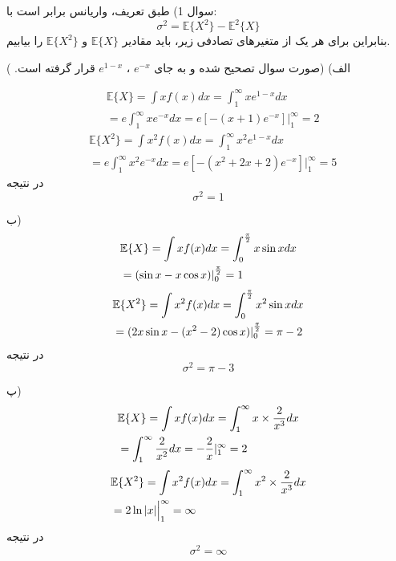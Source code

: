 \documentclass[10pt,letterpaper]{report}
\begin{document}
سوال 1) طبق تعریف، واریانس برابر است با:
$$
\sigma^2=\mathbb{E}\{X^2\}-\mathbb{E}^2\{X\}
$$
بنابراین برای هر یک از متغیرهای تصادفی زیر، باید مقادیر 
$
\mathbb{E}\{X\}
$
و
$
\mathbb{E}\{X^2\}
$
را بیابیم.

الف) 
{\color{red}
(صورت سوال تصحیح شده و به جای
 $e^{-x}$
،
$e^{1-x}$
قرار گرفته است.
)
}

\begin{equation}
\begin{split}
&
\mathbb{E}\{X\}=\int xf(x)dx=\int_1^\infty xe^{1-x}dx
\\&=
e\int_1^\infty xe^{-x}dx
=e[-(x+1)e^{-x}]|_{1}^\infty=2
\end{split}
\end{equation}
\begin{equation}
\begin{split}
&
\mathbb{E}\{X^2\}=\int x^2f(x)dx=\int_1^\infty x^2e^{1-x}dx
\\&=
e\int_1^\infty x^2e^{-x}dx
=e[-(x^2+2x+2)e^{-x}]|_{1}^\infty=5
\end{split}
\end{equation}
در نتیجه
$$
\sigma^2=1
$$

ب) 
\begin{equation}
\begin{split}
&
\mathbb{E}\{X\}=\int xf(x)dx=\int_0^{\pi\over 2} x\sin xdx
\\&=(\sin x-x\cos x)|_0^{\pi \over 2}=1
\end{split}
\end{equation}
\begin{equation}
\begin{split}
&
\mathbb{E}\{X^2\}=\int x^2f(x)dx=\int_0^{\pi\over 2} x^2\sin xdx
\\&=
(2x\sin x-(x^2-2)\cos x)|_0^{\pi \over 2}=\pi-2
\end{split}
\end{equation}
در نتیجه
$$
\sigma^2=\pi-3
$$

پ)
\begin{equation}
\begin{split}
&
\mathbb{E}\{X\}=\int xf(x)dx=\int_1^\infty x\times {2\over x^3}dx
\\&=
\int_1^\infty {2\over x^2}dx
=-{2\over x}|_{1}^\infty=2
\end{split}
\end{equation}
\begin{equation}
\begin{split}
&
\mathbb{E}\{X^2\}=\int x^2f(x)dx=\int_1^\infty x^2\times {2\over x^3}dx
\\&
=2\ln |x|\Big|_{1}^\infty=\infty
\end{split}
\end{equation}
در نتیجه
$$
\sigma^2=\infty
$$
\end{document}
